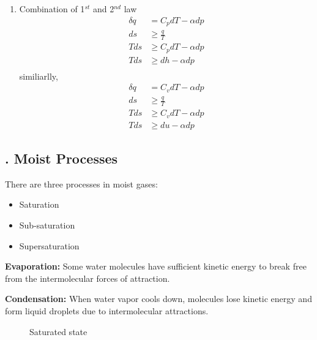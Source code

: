 \documentclass[fleqn,10pt]{SelfArx} %
\begin{document}
\begin{enumerate}
    \item Combination of 1$^{st}$ and 2$^{nd}$ law
        \begin{align}
            \delta q &= C_p dT - \alpha dp \\
            ds &\geq \frac{q}{T} \\
            Tds &\geq C_p dT - \alpha dp \\
            Tds &\geq dh - \alpha dp \\
        \end{align}
        similiarlly,
        \begin{align}
            \delta q &= C_v dT - \alpha dp \\
            ds &\geq \frac{q}{T} \\
            Tds &\geq C_v dT - \alpha dp \\
            Tds &\geq du - \alpha dp
        \end{align}
\end{enumerate}

\subsection{. Moist Processes}
There are three processes in moist gases:
\begin{itemize}[noitemsep]
    \item Saturation
    \item Sub-saturation
    \item Supersaturation
\end{itemize}

\textbf{Evaporation:} Some water molecules have sufficient kinetic energy to break free from the intermolecular forces of attraction.

\textbf{Condensation:} When water vapor cools down, molecules lose kinetic energy and form liquid droplets due to intermolecular attractions.

\begin{figure}[h!]
    \centering
    \caption{Saturated state}
\end{figure}
\end{document}

